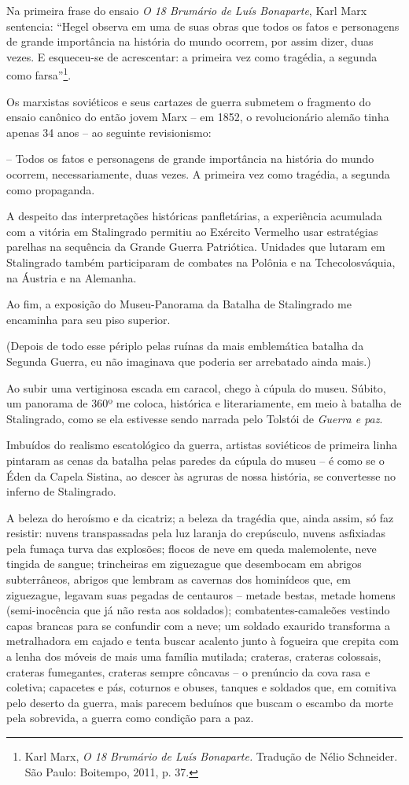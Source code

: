 Na primeira frase do ensaio \emph{O 18 Brumário de Luís Bonaparte}, Karl
Marx sentencia: ``Hegel observa em uma de suas obras que todos os fatos
e personagens de grande importância na história do mundo ocorrem, por
assim dizer, duas vezes. E esqueceu-se de acrescentar: a primeira vez
como tragédia, a segunda como farsa''\footnote{Karl Marx, \emph{O 18
  Brumário de Luís Bonaparte.} Tradução de Nélio Schneider. São Paulo:
  Boitempo, 2011, p. 37.}.

Os marxistas soviéticos e seus cartazes de guerra submetem o fragmento
do ensaio canônico do então jovem Marx -- em 1852, o revolucionário
alemão tinha apenas 34 anos -- ao seguinte revisionismo:

-- Todos os fatos e personagens de grande importância na história do
mundo ocorrem, necessariamente, duas vezes. A primeira vez como
tragédia, a segunda como propaganda.

A despeito das interpretações históricas panfletárias, a experiência
acumulada com a vitória em Stalingrado permitiu ao Exército Vermelho
usar estratégias parelhas na sequência da Grande Guerra Patriótica.
Unidades que lutaram em Stalingrado também participaram de combates na
Polônia e na Tchecolosváquia, na Áustria e na Alemanha.

Ao fim, a exposição do Museu-Panorama da Batalha de Stalingrado me
encaminha para seu piso superior.

(Depois de todo esse périplo pelas ruínas da mais emblemática batalha da
Segunda Guerra, eu não imaginava que poderia ser arrebatado ainda mais.)

Ao subir uma vertiginosa escada em caracol, chego à cúpula do museu.
Súbito, um panorama de 360º me coloca, histórica e literariamente, em
meio à batalha de Stalingrado, como se ela estivesse sendo narrada pelo
Tolstói de \emph{Guerra e paz}.

Imbuídos do realismo escatológico da guerra, artistas soviéticos de
primeira linha pintaram as cenas da batalha pelas paredes da cúpula do
museu -- é como se o Éden da Capela Sistina, ao descer às agruras de
nossa história, se convertesse no inferno de Stalingrado.

A beleza do heroísmo e da cicatriz; a beleza da tragédia que, ainda
assim, só faz resistir: nuvens transpassadas pela luz laranja do
crepúsculo, nuvens asfixiadas pela fumaça turva das explosões; flocos de
neve em queda malemolente, neve tingida de sangue; trincheiras em
ziguezague que desembocam em abrigos subterrâneos, abrigos que lembram
as cavernas dos hominídeos que, em ziguezague, legavam suas pegadas de
centauros -- metade bestas, metade homens (semi-inocência que já não
resta aos soldados); combatentes-camaleões vestindo capas brancas para
se confundir com a neve; um soldado exaurido transforma a metralhadora
em cajado e tenta buscar acalento junto à fogueira que crepita com a
lenha dos móveis de mais uma família mutilada; crateras, crateras
colossais, crateras fumegantes, crateras sempre côncavas -- o prenúncio
da cova rasa e coletiva; capacetes e pás, coturnos e obuses, tanques e
soldados que, em comitiva pelo deserto da guerra, mais parecem beduínos
que buscam o escambo da morte pela sobrevida, a guerra como condição
para a paz.


